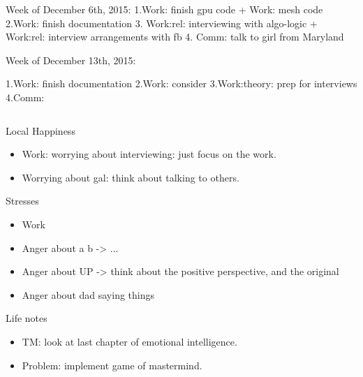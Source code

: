 Week of December 6th, 2015: 
1.Work: finish gpu code + Work: mesh code
2.Work: finish documentation  
3.  Work:rel: interviewing with algo-logic  + Work:rel: interview
arrangements with fb 
4.  Comm: talk to girl from Maryland

Week of December 13th, 2015: 

1.Work: finish documentation 
2.Work: consider 
3.Work:theory: prep for interviews 
4.Comm: 


\begin{frame}
  \begin{columns}
    \begin{column}{0.25\linewidth} %
      \begin{block}{Local Happiness}
        \begin{itemize}
          \tiny \item \tiny Work: worrying about interviewing: just focus on the work. 
        \item \tiny Worrying about gal: think about talking to others. 
        \end{itemize}
      \end{block}
      \begin{block}{Stresses}
        \begin{itemize}
          \tiny \item \tiny Work 
          \item \tiny Anger about a b  -> ...
          \item \tiny Anger about UP -> think about the positive
            perspective, and the original
          \item \tiny Anger about dad saying things 
        \end{itemize}
      \end{block} 
      \begin{block}{Life notes}
        \begin{itemize}
        \item \tiny TM: look at last chapter of emotional
          intelligence.  
        \item \tiny Problem: implement game of mastermind. 
        \end{itemize}
      \end{block}
    \end{column} %


\end{columns}
\end{frame}
